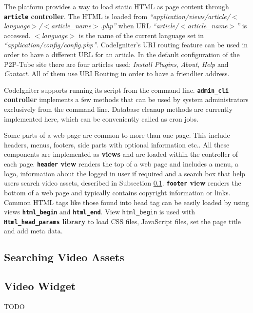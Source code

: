 The platform provides a way to load static HTML as page content through \textbf{\texttt{article} controller}. The HTML is loaded from \textit{``application/views/article/$<$language$>$/$<$article_name$>$.php''} when URL \textit{``article/$<$article_name$>$''} is accessed. \textit{$<$language$>$} is the name of the current language set in \textit{``application/config/config.php''}. CodeIgniter's URI routing feature can be used in order to have a different URL for an article. In the default configuration of the P2P-Tube site there are four articles used: \textit{Install Plugins}, \textit{About}, \textit{Help} and \textit{Contact}. All of them use URI Routing in order to have a friendlier address.

CodeIgniter supports running its script from the command line. \textbf{\texttt{admin_cli} controller} implements a few methods that can be used by system administrators exclusively from the command line. Database cleanup methods are currently implemented here, which can be conveniently called as cron jobs.

Some parts of a web page are common to more than one page. This include headers, menus, footers, side parts with optional information etc.. All these components are implemented as \textbf{views} and are loaded within the controller of each page. \textbf{\texttt{header} view} renders the top of a web page and includes a menu, a logo, information about the logged in user if required and a search box that help users search video assets, described in Subsection \ref{subsec:searching}. \textbf{\texttt{footer} view} renders the bottom of a web page and typically contains copyright information or links. Common HTML tags like those found into head tag can be easily loaded by using views \textbf{\texttt{html_begin}} and \textbf{\texttt{html_end}}. View \texttt{html_begin} is used with \textbf{\texttt{Html_head_params} library} to load CSS files, JavaScript files, set the page title and add meta data.

\subsection{Searching Video Assets}
\label{subsec:searching}

\subsection{Video Widget}
\label{subsec:video-widget}

TODO

